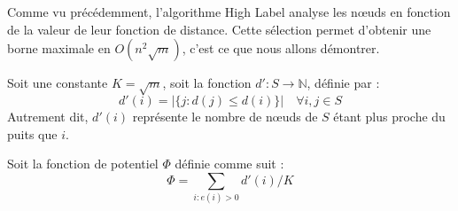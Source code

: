 Comme vu précédemment, l'algorithme High Label analyse les n\oe uds en fonction de la valeur de leur
fonction de distance. Cette sélection permet d'obtenir une borne maximale en $O(n^2\sqrt{m})$, c'est
ce que nous allons démontrer.

Soit une constante $K = \sqrt{m}$, soit la fonction $d': S \longrightarrow \mathbb{N}$, définie par
: $$
d'(i) = |\{j : d(j) \leq d(i) \}| \quad \forall i,j \in S $$
Autrement dit, $d'(i)$ représente le nombre de n\oe uds de $S$ étant plus proche du puits que $i$.

Soit la fonction de potentiel $\Phi$ définie comme suit : $$
\Phi = \sum_{i : e(i) > 0} d'(i) / K $$


